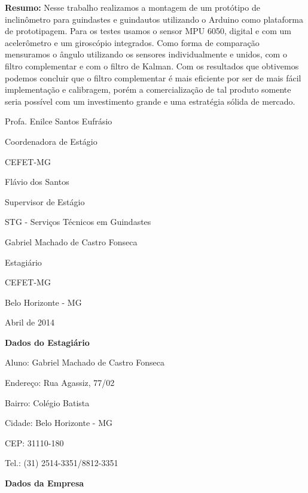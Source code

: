\documentclass[a4paper,12pt]{article}
\begin{document}
\vspace{2cm}
\noindent
\textbf{Resumo:} Nesse trabalho realizamos a montagem de um protótipo de inclinômetro para guindastes e guindautos utilizando o Arduino como plataforma de prototipagem. Para os testes usamos o sensor MPU 6050, digital e com um acelerômetro e um giroscópio integrados. Como forma de comparação mensuramos o ângulo utilizando os sensores individualmente e unidos, com o filtro complementar e com o filtro de Kalman. Com os resultados que obtivemos podemos concluir que o filtro complementar é mais eficiente por ser de mais fácil implementação e calibragem, porém a comercialização de tal produto somente seria possível com um investimento grande e uma estratégia sólida de mercado.

\vfill

\begin{center}
Profa. Enilce Santos Eufrásio

Coordenadora de Estágio

CEFET-MG

\vfill

Flávio dos Santos

Supervisor de Estágio

STG - Serviços Técnicos em Guindastes

\vfill

Gabriel Machado de Castro Fonseca

Estagiário

CEFET-MG

\vfill

Belo Horizonte - MG

Abril de 2014
\end{center}

\newpage
\thispagestyle{empty}

\begin{center}
\Large\bf Dados do Estagiário
\end{center}

\vspace{1.5cm}
Aluno: Gabriel Machado de Castro Fonseca

Endereço: Rua Agassiz, 77/02

Bairro: Colégio Batista

Cidade: Belo Horizonte - MG

CEP: 31110-180

Tel.: (31) 2514-3351/8812-3351

\vspace{5cm}

\begin{center}
\Large\bf Dados da Empresa
\end{center}
\end{document}
